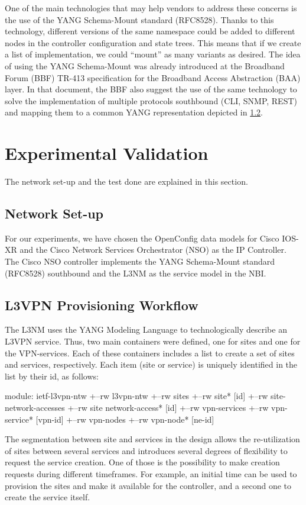 \documentclass[conference]{IEEEtran}
\begin{document}
One of the main technologies that may help vendors to address these concerns is the use of the YANG Schema-Mount standard (RFC8528). Thanks to this technology, different versions of the same namespace could be added to different nodes in the controller configuration and state trees. This means that if we create a list of implementation, we could “mount” as many variants as desired. The idea of using the YANG Schema-Mount was already introduced at the Broadband Forum (BBF) TR-413 specification for the Broadband Access Abstraction (BAA) layer. In that document, the BBF also suggest the use of the same technology to solve the implementation of multiple protocols southbound (CLI, SNMP, REST) and mapping them to a common YANG representation depicted in \ref{}.
\section{Experimental Validation}
The network set-up and the test done are explained in this section.

\subsection{Network Set-up}
For our experiments, we have chosen the OpenConfig data models for Cisco IOS-XR and the Cisco Network Services Orchestrator (NSO) as the IP Controller. The Cisco NSO controller implements the YANG Schema-Mount standard (RFC8528) southbound and the L3NM as the service model in the NBI.

\subsection{L3VPN Provisioning Workflow}

The L3NM uses the YANG Modeling Language to technologically describe an L3VPN service. Thus, two main containers were defined, one for sites and one for the VPN-services. Each of these containers includes a list to create a set of sites and services, respectively. Each item (site or service) is uniquely identified in the list by their id, as follows:

module: ietf-l3vpn-ntw
+--rw l3vpn-ntw
  +--rw sites
   +--rw site* [id]
    +--rw site-network-accesses
       +--rw site network-access* [id]
   +--rw vpn-services
       +--rw vpn-service* [vpn-id]
+--rw vpn-nodes
    +--rw vpn-node* [ne-id]

The segmentation between site and services in the design allows the re-utilization of sites between several services and introduces several degrees of flexibility to request the service creation. One of those is the possibility to make creation requests during different timeframes. For example, an initial time can be used to provision the sites and make it available for the controller, and a second one to create the service itself.
\end{document}
